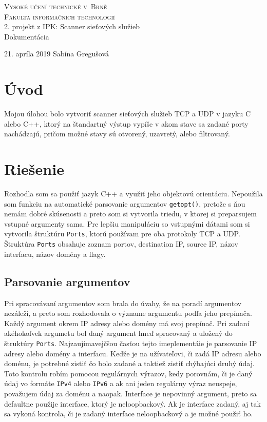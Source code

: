 \documentclass[11pt, a4paper]{article}
\begin{document}
\begin{titlepage}
\begin{center}
\Huge
\textsc{Vysoké učení technické v~Brně}\\
\huge
\textsc{Fakulta informačních technologií}\\
\LARGE 2. projekt z IPK: Scanner sieťových služieb\\
\Huge Dokumentácia
\end{center}
{\Large 21. apríla 2019 \hfill
Sabína Gregušová}
\end{titlepage}

\tableofcontents
\clearpage

\section{Úvod}
Mojou úlohou bolo vytvoriť scanner sieťových služieb TCP a UDP v jazyku C alebo C++, ktorý na štandartný výstup vypíše v akom stave sa zadané porty nachádzajú, pričom možné stavy sú otvorený, uzavretý, alebo filtrovaný.

\section{Riešenie}
Rozhodla som sa použiť jazyk C++ a využiť jeho objektovú orientáciu. Nepoužila som funkciu na automatické parsovanie argumentov \texttt{getopt()}, pretože s ňou nemám dobré skúsenosti a preto som si vytvorila triedu, v ktorej si preparsujem vstupné argumenty sama. Pre lepšiu manipuláciu so vstupnými dátami som si vytvorila štruktúru \texttt{Ports}, ktorú používam pre oba protokoly TCP a UDP. Štruktúra \texttt{Ports} obsahuje zoznam portov, destination IP, source IP, názov interfacu, názov domény a flagy.

\subsection{Parsovanie argumentov}
Pri spracovávaní argumentov som brala do úvahy, že na poradí argumentov nezáleží, a preto som rozhodovala o význame argumentu podľa jeho prepínača. Každý argument okrem IP adresy alebo domény má svoj prepínač. Pri zadaní akéhokoľvek argumetu bol daný argument hneď spracovaný a uložený do štruktúry \texttt{Ports}. Najzaujímavejčšou časťou tejto imeplementáie je parsovanie IP adresy alebo domény a interfacu. Keďže je na užívateľovi, či zadá IP adresu alebo doménu, je potrebné zistiť čo bolo zadané a taktiež zistiť chýbajúci druhý údaj. Toto kontrolu robím pomocou regulárnych výrazov, kedy porovnám, či je daný údaj vo formáte \texttt{IPv4} alebo \texttt{IPv6} a ak ani jeden regulárny výraz neuspeje, považujem údaj za doménu a naopak. Interface je nepovinný argument, preto sa defaultne použije interface, ktorý je neloopbackový. Ak je interface zadaný, aj tak sa vykoná kontrola, či je zadaný interface neloopbackový a je možné použiť ho. 
\end{document}
